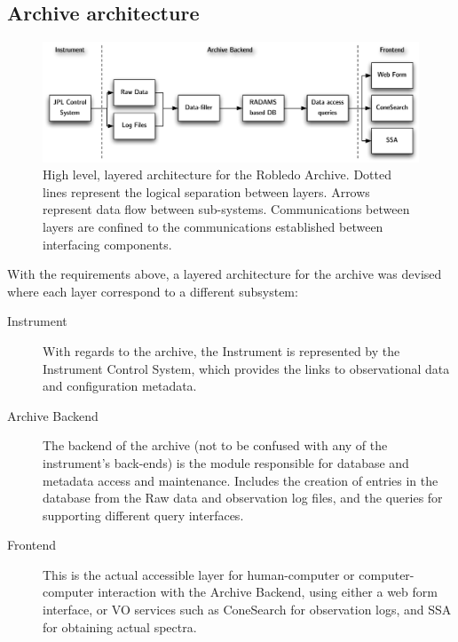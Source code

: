 		\subsection{Archive architecture} %
		\label{sub:archive_architecture_dss63}
			
			\begin{figure}[tbp]
				\begin{center}
					\includegraphics[width=\textwidth]
					{fig/DSS63_ArchiveArchitecture.pdf}
				\end{center}
				\caption[High level, layered architecture for the
				Robledo Archive]
				{High level, layered architecture for the Robledo
				Archive. Dotted lines represent the logical
				separation between layers. Arrows represent data
				flow between sub-systems. Communications between
				layers are confined to the communications
				established between interfacing components.}
				\label{figDss63ArchiveArchitecture}
			\end{figure}
			
			With the requirements above, a layered
			architecture for the archive was devised where each
			layer correspond to a different subsystem:
			
			\begin{description}
				\item[Instrument] With regards to the archive, the
				Instrument is represented by the Instrument Control
				System, which provides the links to observational
				data and configuration metadata.
				

				\item[Archive Backend] The backend of the archive 
				(not to be confused with any of the instrument’s
				back-ends) is the module responsible for database
				and metadata access and maintenance. Includes the
				creation of entries in the database from the Raw
				data and observation log files, and the queries for
				supporting different query interfaces.
				
				
				\item[Frontend] This is the actual accessible layer
				for human-computer or computer-computer interaction
				with the Archive Backend, using either a web form
				interface, or VO services such as ConeSearch for
				observation logs, and SSA for obtaining actual
				spectra.
			\end{description}
			
